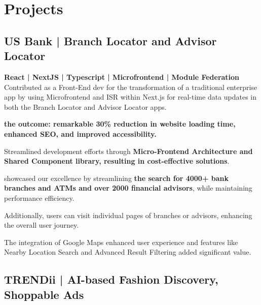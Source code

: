 \documentclass[letterpaper]{deedy-resume} %
\begin{document}
\begin{minipage}[t]{0.66\textwidth}
\sectionspace %







\section{Projects}


\subsection{US Bank | Branch Locator\texorpdfstring{\href{https://www.usbank.com/locations/search/}{\faExternalLink}}{External Link} and Advisor Locator\texorpdfstring{\href{https://www.usbank.com/wealth-management/find-an-advisor/}{\faExternalLink}}{External Link}}

\textbf{React | NextJS | Typescript | Microfrontend | Module Federation}  \\
Contributed as a Front-End dev for the transformation of a traditional enterprise app by using Microfrontend and ISR within Next.js for real-time data updates in both the Branch Locator and Advisor Locator apps.

\textbf{the outcome: remarkable 30\% reduction in website loading time, enhanced SEO, and improved accessibility.}

Streamlined development efforts through \textbf{Micro-Frontend Architecture and Shared Component library, resulting in cost-effective solutions}.

showcased our excellence by
streamlining \textbf{the search for 4000+ bank branches and
ATMs and over 2000 financial advisors}, while maintaining performance efficiency.

Additionally, users can visit individual pages of branches or advisors, enhancing the overall user journey.

The integration of Google Maps enhanced user
experience and features like Nearby Location Search
and Advanced Result Filtering added significant value.


\sectionspace %

\subsection{TRENDii\href{https://www.trendii.com/}{\texorpdfstring{\faExternalLink}{}} | AI-based Fashion Discovery, Shoppable Ads}



\end{minipage}
\end{document}
